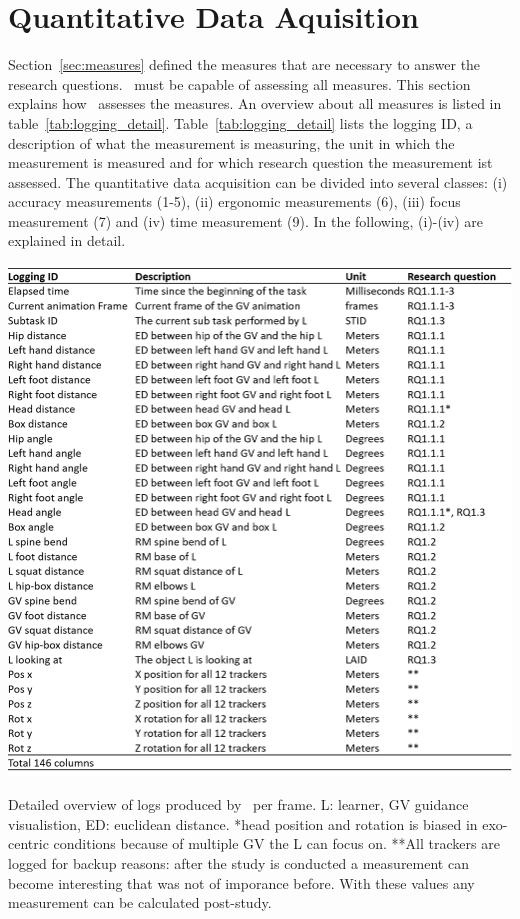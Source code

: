 \section{Quantitative Data Aquisition}
\label{sec:logging}
Section~\ref{sec:measures} defined the measures that are necessary to answer the research questions. \exgo\ must be capable of assessing all measures. This section explains how \exgo\ assesses the measures. An overview about all measures is listed in table~\ref{tab:logging_detail}. Table~\ref{tab:logging_detail} lists the logging ID, a description of what the measurement is measuring, the unit in which the measurement is measured and for which research question the measurement ist assessed. The quantitative data acquisition can be divided into several classes: (i) accuracy measurements (1-5), (ii) ergonomic measurements (6), (iii) focus measurement (7) and (iv) time measurement (9). In the following, (i)-(iv) are explained in detail.
\begin{table}[H]
	\centering
	\includegraphics[width=\textwidth]{figures/logging_detail.png}
	\caption[logging detail]{Detailed overview of logs produced by \exgo\ per frame. L: learner, GV guidance visualistion, ED: euclidean distance. *head position and rotation is biased in exo-centric conditions because of multiple GV the L can focus on. **All trackers are logged for backup reasons: after the study is conducted a measurement can become interesting that was not of imporance before. With these values any measurement can be calculated post-study.}
	\label{tab:logging_detail}
\end{table}


